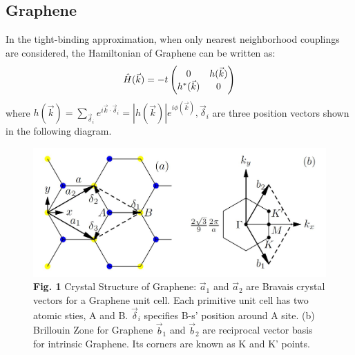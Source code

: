 \documentclass[letterpaper,10pt,english]{sphinxmanual}
\begin{document}
\subsection{Graphene}
\label{TI/Weyl_semi-metal:graphene}
In the tight-binding approximation, when only nearest neighborhood couplings are considered, the Hamiltonian of Graphene can be written as:
\begin{gather}
\begin{split}\hat{H}(\vec{k})=-t\begin{pmatrix}0 &h(\vec{k})\\h^*(\vec{k}) &0\end{pmatrix}\end{split}\notag
\end{gather}
where \(h(\vec{k})=\sum\limits_{\vec{\delta}_i}e^{i\vec{k}\cdot\vec{\delta}_i}=|h(\vec{k})|e^{i\phi(\vec{k})},\vec{\delta}_i\) are three position vectors shown in the following diagram.
\begin{figure}[htbp]
\centering
\capstart

\includegraphics[width=0.700\linewidth]{12.png}
\caption{\textbf{Fig. 1}  Crystal Structure of Graphene: \(\vec{a}_{1}\) and \(\vec{a}_{2}\)
are Bravais crystal vectors for a Graphene unit cell. Each primitive
unit cell has two atomic sties, A and B. \(\vec{\delta}_{i}\) specifies
B-s' position around A site. (b) Brillouin Zone for Graphene
\(\vec{b}_{1}\) and \(\vec{b}_{2}\) are reciprocal vector basis for
intrinsic Graphene. Its corners are known as K and K' points.}\end{figure}
\end{document}
